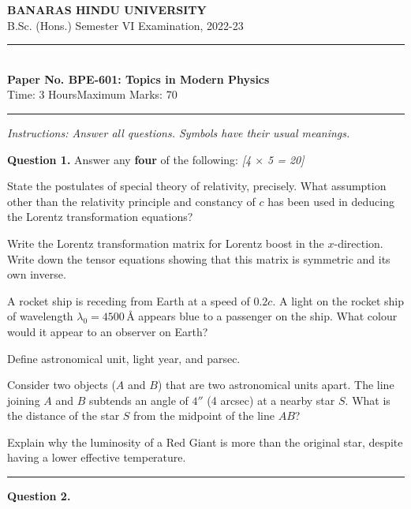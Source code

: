 \documentclass[11pt,a4paper]{article}
\newcommand{\pts}[1]{\hfill   \textit{[#1]}}
\begin{document}
\begin{center}
  {\large\bfseries BANARAS HINDU UNIVERSITY}\\[2pt]
  {\normalsize B.Sc. (Hons.) Semester VI Examination, 2022-23}\\[6pt]
  \rule{0.8\linewidth}{0.5pt}\\[6pt]
  {\large\bfseries Paper No. BPE-601: Topics in Modern Physics}\\[4pt]
  {\normalsize Time: 3 Hours\hfill Maximum Marks: 70}
\end{center}
\rule{\linewidth}{0.4pt}
\smallskip



\noindent   \textit{Instructions: Answer all questions. Symbols have their usual meanings.}
\bigskip




\noindent   \textbf{Question 1.} Answer any   \textbf{four} of the following: \pts{4 $ \times$ 5 = 20}

\begin{parts}
  \item State the postulates of special theory of relativity, precisely. What assumption other than the relativity principle and constancy of $c$ has been used in deducing the Lorentz transformation equations?
  \item Write the Lorentz transformation matrix for Lorentz boost in the $x$-direction. Write down the tensor equations showing that this matrix is symmetric and its own inverse.
  \item A rocket ship is receding from Earth at a speed of $0.2c$. A light on the rocket ship of wavelength $\lambda_0 = 4500\, \text{\AA}$ appears blue to a passenger on the ship. What colour would it appear to an observer on Earth?
  \item Define astronomical unit, light year, and parsec.
  \item Consider two objects ($A$ and $B$) that are two astronomical units apart. The line joining $A$ and $B$ subtends an angle of $4''$ (4 arcsec) at a nearby star $S$. What is the distance of the star $S$ from the midpoint of the line $AB$?
  \item Explain why the luminosity of a Red Giant is more than the original star, despite having a lower effective temperature.
\end{parts}

\medskip\rule{\linewidth}{0.2pt}




\noindent   \textbf{Question 2.}
\end{document}
